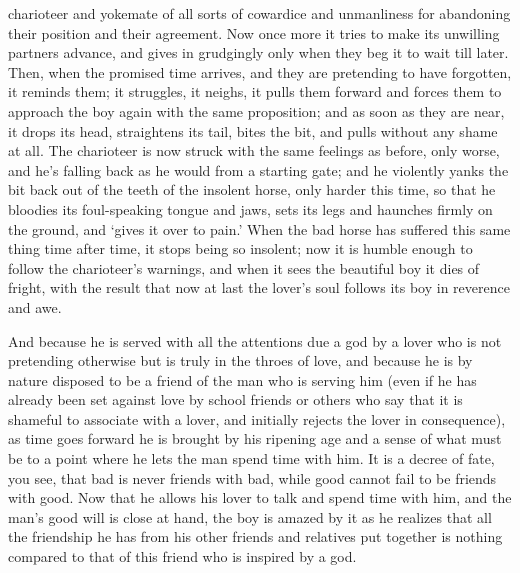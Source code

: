 charioteer and yokemate of all sorts of cowardice and unmanliness for
abandoning their position and their agreement. Now once more it
tries to make its unwilling partners advance, and gives in grudgingly
only when they beg it to wait till later. Then, when the promised time
arrives, and they are pretending to have forgotten, it reminds them; it
struggles, it neighs, it pulls them forward and forces them to approach
the boy again with the same proposition; and as soon as they are near,
it drops its head, straightens its tail, bites the bit, and pulls
without any shame at all. The charioteer is now struck with the same 
feelings as before, only worse, and he’s falling back as he
would from a starting gate; and he violently yanks the bit back out of
the teeth of the insolent horse, only harder this time, so that he
bloodies its foul-speaking tongue and jaws, sets its legs and haunches
firmly on the ground, and ‘gives it over to
pain.’ When the bad
horse has suffered this same thing time after time, it stops being so
insolent; now it is humble enough to follow the charioteer’s warnings,
and when it sees the beautiful boy it dies of fright, with the result
that now at last the lover’s soul follows its boy in reverence and awe.

And because he is served with all the attentions due a
god by a lover who is not pretending otherwise but is truly in the
throes of love, and because he is by nature disposed to be a friend of
the man who is serving him (even if he has already been set against love
by school friends or others who say that it is shameful to associate
with a lover, and initially rejects the lover in consequence), as time
goes forward he is brought by his ripening age and a sense of
what must be to a point where he lets the man spend time with him. It is
a decree of fate, you see, that bad is never friends with bad, while
good cannot fail to be friends with good. Now that he allows his lover
to talk and spend time with him, and the man’s good will is close at
hand, the boy is amazed by it as he realizes that all the friendship he
has from his other friends and relatives put together is nothing
compared to that of this friend who is inspired by a god.

